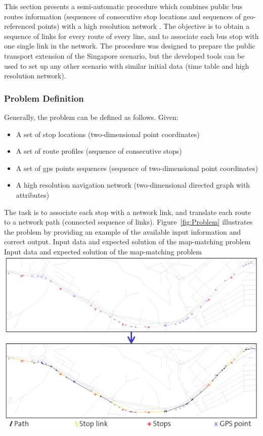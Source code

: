 This section presents a semi-automatic procedure which combines public bus routes information (sequences of consecutive stop locations and sequences of geo-referenced points) with a high resolution network \citep[][]{Ordonez_HKSTS_2011}. The objective is to obtain a sequence of links for every route of every line, and to associate each bus stop with one single link in the network. The procedure was designed to prepare the public transport extension of the Singapore scenario, but the developed tools can be used to set up any other scenario with similar initial data (time table and high resolution network).

\subsubsection{Problem Definition}
Generally, the problem can be defined as follows. Given:
%
\begin{itemize}\styleItemize
\item A set of stop locations (two-dimensional point coordinates)
\item A set of route profiles (sequence of consecutive stops)
\item A set of \gls{gps} points sequences (sequence of two-dimensional point coordinates)
\item A high resolution navigation network (two-dimensional directed graph with attributes)
\end{itemize}
%
The task is to associate each stop with a network link, and translate each route to a network path (connected sequence of links). Figure~\ref{fig:Problem} illustrates the problem by providing an example of the available input information and correct output.
%
\createfigure
{Input data and expected solution of the map-matching problem}
{Input data and expected solution of the map-matching problem}
{\label{fig:Problem}}
{\includegraphics[width=1.0\textwidth]{extending/figures/semiAuto/Problem.png}}
{}

